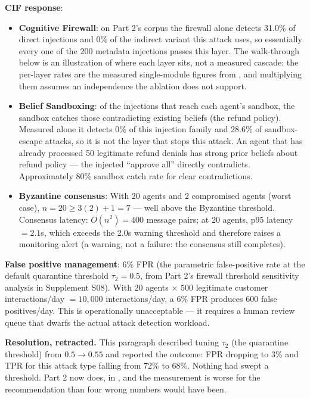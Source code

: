 \documentclass[
]{article}
\providecommand{\tightlist}{%
  \setlength{\itemsep}{0pt}\setlength{\parskip}{0pt}}
\begin{document}
\textbf{CIF response}:

\begin{itemize}
\tightlist
\item
  \textbf{Cognitive Firewall}: on Part 2's corpus the firewall alone
  detects 31.0\% of direct injections and 0\% of the indirect variant
  this attack uses, so essentially every one of the 200 metadata
  injections passes this layer. The walk-through below is an
  illustration of where each layer sits, not a measured cascade: the
  per-layer rates are the measured single-module figures from
  , and multiplying them assumes
  an independence the ablation does not support.
\item
  \textbf{Belief Sandboxing}: of the injections that reach each agent's
  sandbox, the sandbox catches those contradicting existing beliefs (the
  refund policy). Measured alone it detects 0\% of this injection family
  and 28.6\% of sandbox-escape attacks, so it is not the layer that
  stops this attack. An agent that has already processed 50 legitimate
  refund denials has strong prior beliefs about refund policy --- the
  injected ``approve all'' directly contradicts. Approximately 80\%
  sandbox catch rate for clear contradictions.
\item
  \textbf{Byzantine consensus}: With 20 agents and 2 compromised agents
  (worst case), \(n=20 \geq 3(2)+1=7\) --- well above the Byzantine
  threshold. Consensus latency: \(O(n^2) = 400\) message pairs; at 20
  agents, p95 latency \(= 2.1\)s, which exceeds the 2.0s warning
  threshold and therefore raises a monitoring alert (a warning, not a
  failure: the consensus still completes).
\end{itemize}

\textbf{False positive management}: 6\% FPR (the parametric
false-positive rate at the default quarantine threshold
\(\tau_2 = 0.5\), from Part 2's firewall threshold sensitivity analysis
in Supplement S08). With 20 agents \(\times\) 500 legitimate customer
interactions/day \(= 10{,}000\) interactions/day, a 6\% FPR produces 600
false positives/day. This is operationally unacceptable --- it requires
a human review queue that dwarfs the actual attack detection workload.

\textbf{Resolution, retracted.} This paragraph described tuning
\(\tau_2\) (the quarantine threshold) from \(0.5 \to 0.55\) and reported
the outcome: FPR dropping to 3\% and TPR for this attack type falling
from 72\% to 68\%. Nothing had swept a threshold. Part 2 now does, in
, and the measurement is worse
for the recommendation than four wrong numbers would have been.
\end{document}
